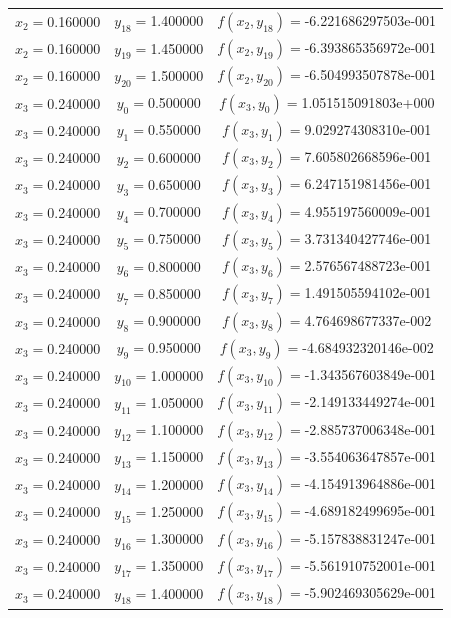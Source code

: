 \begin{longtable}{ccc}
$x_{2}=$0.160000 & $y_{18}=$1.400000 & $f(x_{2},y_{18})=$-6.221686297503e-001 \\
$x_{2}=$0.160000 & $y_{19}=$1.450000 & $f(x_{2},y_{19})=$-6.393865356972e-001 \\
$x_{2}=$0.160000 & $y_{20}=$1.500000 & $f(x_{2},y_{20})=$-6.504993507878e-001 \\
$x_{3}=$0.240000 & $y_{0}=$0.500000 & $f(x_{3},y_{0})=$1.051515091803e+000 \\
$x_{3}=$0.240000 & $y_{1}=$0.550000 & $f(x_{3},y_{1})=$9.029274308310e-001 \\
$x_{3}=$0.240000 & $y_{2}=$0.600000 & $f(x_{3},y_{2})=$7.605802668596e-001 \\
$x_{3}=$0.240000 & $y_{3}=$0.650000 & $f(x_{3},y_{3})=$6.247151981456e-001 \\
$x_{3}=$0.240000 & $y_{4}=$0.700000 & $f(x_{3},y_{4})=$4.955197560009e-001 \\
$x_{3}=$0.240000 & $y_{5}=$0.750000 & $f(x_{3},y_{5})=$3.731340427746e-001 \\
$x_{3}=$0.240000 & $y_{6}=$0.800000 & $f(x_{3},y_{6})=$2.576567488723e-001 \\
$x_{3}=$0.240000 & $y_{7}=$0.850000 & $f(x_{3},y_{7})=$1.491505594102e-001 \\
$x_{3}=$0.240000 & $y_{8}=$0.900000 & $f(x_{3},y_{8})=$4.764698677337e-002 \\
$x_{3}=$0.240000 & $y_{9}=$0.950000 & $f(x_{3},y_{9})=$-4.684932320146e-002 \\
$x_{3}=$0.240000 & $y_{10}=$1.000000 & $f(x_{3},y_{10})=$-1.343567603849e-001 \\
$x_{3}=$0.240000 & $y_{11}=$1.050000 & $f(x_{3},y_{11})=$-2.149133449274e-001 \\
$x_{3}=$0.240000 & $y_{12}=$1.100000 & $f(x_{3},y_{12})=$-2.885737006348e-001 \\
$x_{3}=$0.240000 & $y_{13}=$1.150000 & $f(x_{3},y_{13})=$-3.554063647857e-001 \\
$x_{3}=$0.240000 & $y_{14}=$1.200000 & $f(x_{3},y_{14})=$-4.154913964886e-001 \\
$x_{3}=$0.240000 & $y_{15}=$1.250000 & $f(x_{3},y_{15})=$-4.689182499695e-001 \\
$x_{3}=$0.240000 & $y_{16}=$1.300000 & $f(x_{3},y_{16})=$-5.157838831247e-001 \\
$x_{3}=$0.240000 & $y_{17}=$1.350000 & $f(x_{3},y_{17})=$-5.561910752001e-001 \\
$x_{3}=$0.240000 & $y_{18}=$1.400000 & $f(x_{3},y_{18})=$-5.902469305629e-001 \\

\end{longtable}

